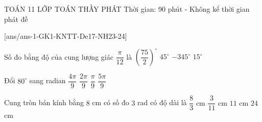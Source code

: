 \begin{name}
	{\tenchude}
	{TOÁN 11}
	{LỚP TOÁN THẦY PHÁT}
	{Thời gian: 90 phút - Không kể thời gian phát đề}
\end{name}
\setcounter{ex}{0}\setcounter{bt}{0}
[ans/ans-1-GK1-KNTT-De17-NH23-24]
\begin{ex}%
Số đo bằng độ của cung lượng giác $\dfrac{\pi}{12}$ là
\choice
{$\left(\dfrac{75}{2}\right)^{\circ}$}
{$45^{\circ}$}
{$-345^{\circ}$}
{\True $15^{\circ}$}
	\end{ex}
\begin{ex}%
Đổi $80^{\circ}$ sang radian
	\choice
{\True $\dfrac{4 \pi}{9}$}
{$\dfrac{2 \pi}{9}$}
{$\dfrac{\pi}{9}$}
{$\dfrac{5 \pi}{9}$}
\end{ex}
\begin{ex}%
Cung tròn bán kính bằng $8$ cm có số đo $3$ rad có độ dài là
	\choice
	{$\dfrac{8}{3}$ cm}
	{$\dfrac{3}{11}$ cm}
	{$11$ cm}
	{\True $24$ cm}
\end{ex}
	
